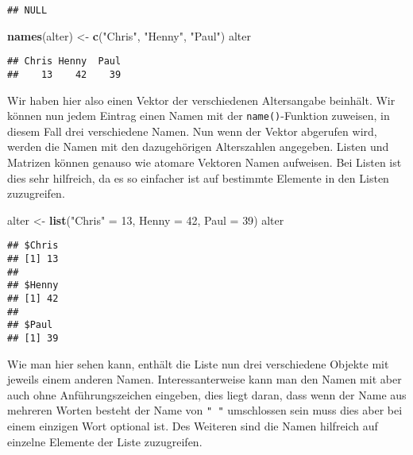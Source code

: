 \documentclass[
]{book}
\newenvironment{Shaded}{\begin{snugshade}}{\end{snugshade}}
\newcommand{\DataTypeTok}[1]{\textcolor[rgb]{0.13,0.29,0.53}{#1}}
\newcommand{\DecValTok}[1]{\textcolor[rgb]{0.00,0.00,0.81}{#1}}
\newcommand{\KeywordTok}[1]{\textcolor[rgb]{0.13,0.29,0.53}{\textbf{#1}}}
\newcommand{\NormalTok}[1]{#1}
\newcommand{\OperatorTok}[1]{\textcolor[rgb]{0.81,0.36,0.00}{\textbf{#1}}}
\newcommand{\StringTok}[1]{\textcolor[rgb]{0.31,0.60,0.02}{#1}}
\begin{document}
\begin{verbatim}
## NULL
\end{verbatim}

\begin{Shaded}
\begin{Highlighting}[]
\KeywordTok{names}\NormalTok{(alter) <-}\StringTok{ }\KeywordTok{c}\NormalTok{(}\StringTok{"Chris"}\NormalTok{, }\StringTok{"Henny"}\NormalTok{, }\StringTok{"Paul"}\NormalTok{)}
\NormalTok{alter}
\end{Highlighting}
\end{Shaded}

\begin{verbatim}
## Chris Henny  Paul 
##    13    42    39
\end{verbatim}

Wir haben hier also einen Vektor der verschiedenen Altersangabe beinhält.
Wir können nun jedem Eintrag einen Namen mit der \texttt{name()}-Funktion zuweisen, in diesem Fall drei verschiedene Namen.
Nun wenn der Vektor abgerufen wird, werden die Namen mit den dazugehörigen Alterszahlen angegeben.
Listen und Matrizen können genauso wie atomare Vektoren Namen aufweisen.
Bei Listen ist dies sehr hilfreich, da es so einfacher ist auf bestimmte Elemente in den Listen zuzugreifen.

\begin{Shaded}
\begin{Highlighting}[]
\NormalTok{alter <-}\StringTok{ }\KeywordTok{list}\NormalTok{(}\StringTok{"Chris"}\NormalTok{ =}\StringTok{ }\DecValTok{13}\NormalTok{, }\DataTypeTok{Henny =} \DecValTok{42}\NormalTok{, }\DataTypeTok{Paul =} \DecValTok{39}\NormalTok{)}
\NormalTok{alter}
\end{Highlighting}
\end{Shaded}

\begin{verbatim}
## $Chris
## [1] 13
## 
## $Henny
## [1] 42
## 
## $Paul
## [1] 39
\end{verbatim}

Wie man hier sehen kann, enthält die Liste nun drei verschiedene Objekte mit jeweils einem anderen Namen.
Interessanterweise kann man den Namen mit aber auch ohne Anführungszeichen eingeben, dies liegt daran,
dass wenn der Name aus mehreren Worten besteht der Name von \texttt{"\ "} umschlossen sein muss dies aber bei einem einzigen Wort optional ist.
Des Weiteren sind die Namen hilfreich auf einzelne Elemente der Liste zuzugreifen.

\begin{Shaded}
\end{Shaded}
\end{document}
